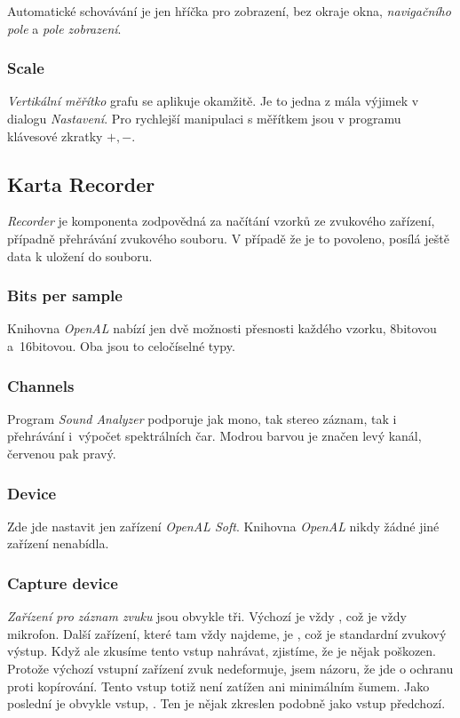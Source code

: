 Automatické schovávání je jen hříčka pro  zobrazení, bez okraje okna, \emph{navigačního pole} a \emph{pole zobrazení}.

\subsubsection{Scale}

\emph{Vertikální měřítko} grafu se aplikuje okamžitě. Je to jedna z mála výjimek v dialogu \emph{Nastavení}. Pro rychlejší manipulaci s měřítkem jsou v programu klávesové zkratky $+,-$.

\subsection{Karta Recorder}

\emph{Recorder} je komponenta zodpovědná za načítání vzorků ze zvukového zařízení, případně přehrávání zvukového souboru. V případě že je to povoleno, posílá ještě data k uložení do souboru.

\subsubsection{Bits per sample}

Knihovna \emph{OpenAL} nabízí jen dvě možnosti přesnosti každého vzorku, 8bitovou a~16bitovou. Oba jsou to celočíselné typy.

\subsubsection{Channels}

Program \emph{Sound Analyzer} podporuje jak mono, tak stereo záznam, tak i přehrávání i~výpočet spektrálních čar. Modrou barvou je značen levý kanál, červenou pak pravý.

\subsubsection{Device}

Zde jde nastavit jen zařízení \emph{OpenAL Soft}. Knihovna \emph{OpenAL} nikdy žádné jiné zařízení nenabídla.

\subsubsection{Capture device}

\emph{Zařízení pro záznam zvuku} jsou obvykle tři. Výchozí je vždy , což je vždy mikrofon. Další zařízení, které tam vždy najdeme, je , což je standardní zvukový výstup. Když ale zkusíme tento vstup nahrávat, zjistíme, že je nějak poškozen. Protože výchozí vstupní zařízení zvuk nedeformuje, jsem názoru, že jde o ochranu proti kopírování. Tento vstup totiž není zatížen ani minimálním šumem. Jako poslední je obvykle vstup, . Ten je nějak zkreslen podobně jako vstup předchozí.

